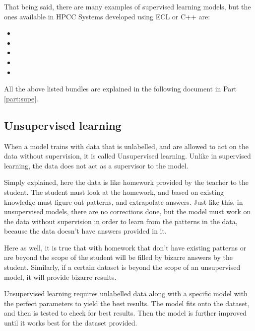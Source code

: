 \documentclass[a4paper,oneside,12pt]{book}
\begin{document}
That being said, there are many examples of supervised learning models, but the ones available in HPCC Systems developed using ECL or C++ are: 

\begin{itemize}
    \item {}
    \item {}
    \item {}
    \item {}
    \item {}
\end{itemize}

All the above listed bundles are explained in the following document in Part \ref{part:supe}.

\subsection{Unsupervised learning}\label{subsec:unsupe}

When a model trains with data that is unlabelled, and are allowed to act on the data without supervision, it is called Unsupervised learning. Unlike in supervised learning, the data does not act as a supervisor to the model.

Simply explained, here the data is like homework provided by the teacher to the student. The student must look at the homework, and based on existing knowledge must figure out patterns, and extrapolate answers. Just like this, in unsupervised models, there are no corrections done, but the model must work on the data without supervision in order to learn from the patterns in the data, because the data doesn't have answers provided in it. 

Here as well, it is true that with homework that don't have existing patterns or are beyond the scope of the student will be filled by bizarre answers by the student. Similarly, if a certain dataset is beyond the scope of an unsupervised model, it will provide bizarre results.

Unsupervised learning requires unlabelled data along with a specific model with the perfect parameters to yield the best results. The model fits onto the dataset, and then is tested to check for best results. Then the model is further improved until it works best for the dataset provided.

\newpage
\end{document}
